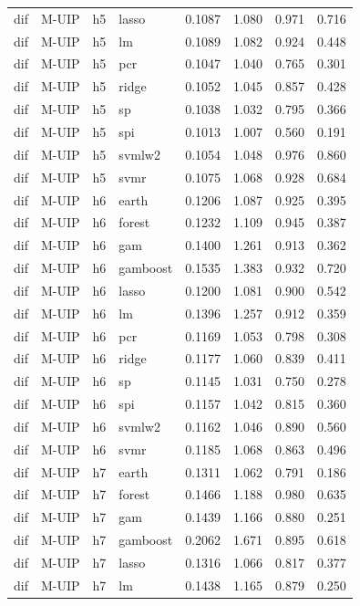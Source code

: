 \begin{ThreePartTable}
\begin{longtable}[t]{llclcccc}
dif & M-UIP & h5 & lasso & 0.1087 & 1.080 & 0.971 & 0.716\\
dif & M-UIP & h5 & lm & 0.1089 & 1.082 & 0.924 & 0.448\\
dif & M-UIP & h5 & pcr & 0.1047 & 1.040 & 0.765 & 0.301\\
dif & M-UIP & h5 & ridge & 0.1052 & 1.045 & 0.857 & 0.428\\
dif & M-UIP & h5 & sp & 0.1038 & 1.032 & 0.795 & 0.366\\
dif & M-UIP & h5 & spi & 0.1013 & 1.007 & 0.560 & 0.191\\
dif & M-UIP & h5 & svmlw2 & 0.1054 & 1.048 & 0.976 & 0.860\\
dif & M-UIP & h5 & svmr & 0.1075 & 1.068 & 0.928 & 0.684\\
\addlinespace
dif & M-UIP & h6 & earth & 0.1206 & 1.087 & 0.925 & 0.395\\
dif & M-UIP & h6 & forest & 0.1232 & 1.109 & 0.945 & 0.387\\
dif & M-UIP & h6 & gam & 0.1400 & 1.261 & 0.913 & 0.362\\
dif & M-UIP & h6 & gamboost & 0.1535 & 1.383 & 0.932 & 0.720\\
dif & M-UIP & h6 & lasso & 0.1200 & 1.081 & 0.900 & 0.542\\
dif & M-UIP & h6 & lm & 0.1396 & 1.257 & 0.912 & 0.359\\
dif & M-UIP & h6 & pcr & 0.1169 & 1.053 & 0.798 & 0.308\\
dif & M-UIP & h6 & ridge & 0.1177 & 1.060 & 0.839 & 0.411\\
dif & M-UIP & h6 & sp & 0.1145 & 1.031 & 0.750 & 0.278\\
dif & M-UIP & h6 & spi & 0.1157 & 1.042 & 0.815 & 0.360\\
dif & M-UIP & h6 & svmlw2 & 0.1162 & 1.046 & 0.890 & 0.560\\
dif & M-UIP & h6 & svmr & 0.1185 & 1.068 & 0.863 & 0.496\\
\addlinespace
dif & M-UIP & h7 & earth & 0.1311 & 1.062 & 0.791 & 0.186\\
dif & M-UIP & h7 & forest & 0.1466 & 1.188 & 0.980 & 0.635\\
dif & M-UIP & h7 & gam & 0.1439 & 1.166 & 0.880 & 0.251\\
dif & M-UIP & h7 & gamboost & 0.2062 & 1.671 & 0.895 & 0.618\\
dif & M-UIP & h7 & lasso & 0.1316 & 1.066 & 0.817 & 0.377\\
dif & M-UIP & h7 & lm & 0.1438 & 1.165 & 0.879 & 0.250\\

\end{longtable}
\end{ThreePartTable}
